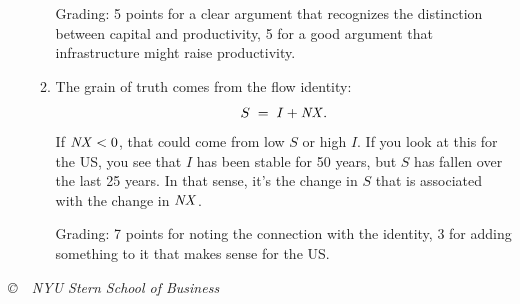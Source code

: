 \documentclass[letterpaper,12pt]{article}
\newcommand{\NX}{\mbox{\em NX\/}}
\begin{document}
\begin{enumerate}
\begin{enumerate}
Grading:  5 points for a clear argument that recognizes the 
distinction between capital and productivity, 5 for a good 
argument that infrastructure might raise productivity. 

\item The grain of truth comes from the flow identity:
\[
    S \;=\; I + \NX.  
\]
If $\NX <0$, that could come from low $S$ or high $I$.  
If you look at this for the US, you see that $I$ has been 
stable for 50 years, but $S$ has fallen over the last 25 years.
In that sense, it's the change in $S$ that is associated with 
the change in $\NX$.  

Grading:  7 points for noting the connection with the 
identity, 3 for adding something to it that makes sense 
for the US.  

\end{enumerate}

\end{enumerate}


\vfill \centerline{\it \copyright \ \number\year \ NYU Stern
School of Business}
\end{document}
